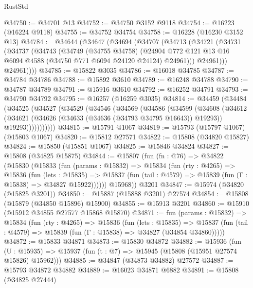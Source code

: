 \begin{lexlean}{RustStd}
\begin{coremodule}
@34750 := @34701 @13
@34752 := @34750 @3152 @9118
@34754 := @16223 (@16224 @9118)
@34755 := @34752 @34754
@34758 := @16228 (@16230 @3152 @13)
@34784 := @34644
    (@34647
      (@34694
        (@34707
          (@34713
            (@34721
              (@34731
                (@34737
                  (@34743
                    (@34749
                      (@34755 @34758)
                      (@24904
                        @772
                        @121
                        @13
                        @16
                        @6094
                        @4588
                        (@34750 @771 @6094 @24120 @24124)
                        @24961)))
                  @24961)))
            @24961))))
@34785 := @15822 @3035
@34786 := @16018 @34785
@34787 := @34784 @34786
@34788 := @15892 @3610
@34789 := @16248 @34788
@34790 := @34787 @34789
@34791 := @15916 @3610
@34792 := @16252 @34791
@34793 := @34790 @34792
@34795 := @16257 (@16259 @3035)
@34814 := @34459
    (@34484
      (@34525
        (@34527
          (@34529
            (@34546
              (@34569
                (@34586
                  (@34599
                    (@34608
                      (@34612
                        (@34621
                          (@34626 (@34633 (@34636 (@34793 @34795 @16643)) @19293))
                          @19293)))))))))))
@34815 := @15791 @1067
@34819 := @15793 (@15797 @1067) (@15803 @1067)
@34820 := @15812 @27571
@34822 := @15808 (@34820 @15827)
@34824 := @15850 (@15851 @1067)
@34825 := @15846 @34824
@34827 := @15808 (@34825 @15875)
@34844 := @15807
    (fun (fn : @76) =>
    @34822
      (@15830
        (@15833
          (fun (params : @15832) =>
          @15834
            (fun (rty : @4265) =>
            @15836
              (fun (lets : @15835) =>
              @15837 (fun (tail : @4579) => @15839 (fun (Γ : @15838) => @34827 @15922))))))
        @15968))
    @3201
@34847 := @15974 (@34820 (@15825 @3201))
@34850 := @15887 (@15888 @3201) @27574
@34854 := @15808 (@15879 (@34850 @15896) @15900)
@34855 := @15913 @3201
@34860 := @15910 (@15912 @34855 @27577 @15868 @15870)
@34871 := fun (params : @15832) =>
  @15834
    (fun (rty : @4265) =>
    @15836
      (fun (lets : @15835) =>
      @15837 (fun (tail : @4579) => @15839 (fun (Γ : @15838) => @34827 (@34854 @34860)))))
@34872 := @15833 @34871
@34873 := @15830 @34872
@34882 := @15936
    (fun (U : @15935) => @15937 (fun (t : @7) => @15945 (@15808 (@15951 @27574 @15826) @15962)))
@34885 := @34847 (@34873 @34882) @27572
@34887 := @15793 @34872 @34882
@34889 := @16023 @34871 @6882
@34891 := @15808 (@34825 @27444)

\end{coremodule}
\end{lexlean}
